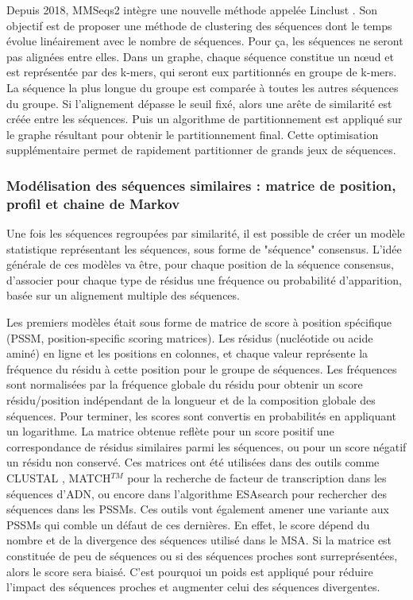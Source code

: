 Depuis 2018, MMSeqs2 intègre une nouvelle méthode appelée Linclust \cite{steinegger_clustering_2018}. Son objectif est de proposer une méthode de clustering des séquences dont le temps évolue linéairement avec le nombre de séquences. Pour ça, les séquences ne seront pas alignées entre elles. Dans un graphe, chaque séquence constitue un n\oe ud et est représentée par des k-mers, qui seront eux partitionnés en groupe de k-mers. La séquence la plus longue du groupe est comparée à toutes les autres séquences du groupe. Si l'alignement dépasse le seuil fixé, alors une arête de similarité est créée entre les séquences. Puis un algorithme de partitionnement est appliqué sur le graphe résultant pour obtenir le partitionnement final. Cette optimisation supplémentaire permet de rapidement partitionner de grands jeux de séquences.

\subsubsection{Modélisation des séquences similaires : matrice de position, profil et chaine de Markov}

Une fois les séquences regroupées par similarité, il est possible de créer un modèle statistique représentant les séquences, sous forme de "séquence" consensus. L'idée générale de ces modèles va être, pour chaque position de la séquence consensus, d'associer pour chaque type de résidus une fréquence ou probabilité d'apparition, basée sur un alignement multiple des séquences.

Les premiers modèles était sous forme de matrice de score à position spécifique (PSSM, position-specific scoring matrices). Les résidus (nucléotide ou acide aminé) en ligne et les positions en colonnes, et chaque valeur représente la fréquence du résidu à cette position pour le groupe de séquences. Les fréquences sont normalisées par la fréquence globale du résidu pour obtenir un score résidu/position indépendant de la longueur et de la composition globale des séquences. Pour terminer, les scores sont convertis en probabilités en appliquant un logarithme. La matrice obtenue reflète pour un score positif une correspondance de résidus similaires parmi les séquences, ou pour un score négatif un résidu non conservé. Ces matrices ont été utilisées dans des outils comme CLUSTAL \cite{higgins_clustal_1988} , MATCH$^{TM}$ \cite{kel_matchtm_2003} pour la recherche de facteur de transcription dans les séquences d'ADN, ou encore dans l'algorithme ESAsearch \cite{beckstette_fast_2006} pour rechercher des séquences dans les PSSMs. Ces outils vont également amener une variante aux PSSMs qui comble un défaut de ces dernières. En effet, le score dépend du nombre et de la divergence des séquences utilisé dans le MSA. Si la matrice est constituée de peu de séquences ou si des séquences proches sont surreprésentées, alors le score sera biaisé. C'est pourquoi un poids est appliqué pour réduire l'impact des séquences proches et augmenter celui des séquences divergentes. 

